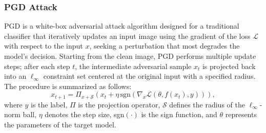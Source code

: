\documentclass[runningheads]{llncs}
\begin{document}
\subsubsection{PGD Attack}
PGD is a white-box adversarial attack algorithm designed for a traditional classifier that iteratively updates an input image using the gradient of the loss $\mathcal{L}$ with respect to the input $x$, seeking a perturbation that most degrades the model’s decision. Starting from the clean image, PGD performs multiple update steps; after each step $t$, the intermediate adversarial sample $x_t$ is projected back into an $\ell_\infty$ constraint set centered at the original input with a specified radius. The procedure is summarized as follows:
\begin{equation}
\label{eq1}
x_{t+1} = \Pi_{x + \mathcal{S}} \left( x_t + \eta \, \text{sgn} \left( \nabla_x \mathcal{L}(\theta, f(x_t), y) \right) \right),
\end{equation}
where $y$ is the label, $\Pi$ is the projection operator, $\mathcal{S}$ defines the radius of the $\ell_\infty$-norm ball, $\eta$ denotes the step size, sgn$(\cdot)$ is the sign function, and $\theta$ represents the parameters of the target model.
\end{document}
